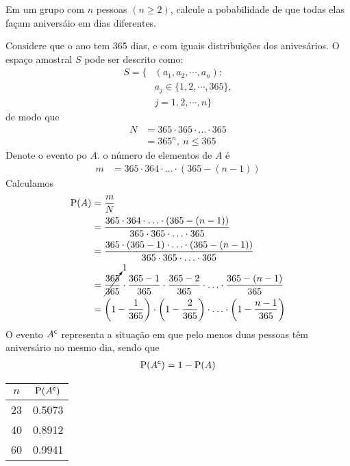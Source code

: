 \begin{example}
    Em um grupo com $n$ pessoas $(n \geq 2)$, calcule a pobabilidade
    de que todas elas façam aniversáio em dias diferentes.
    
    \bigskip
    Considere que o ano tem 365 dias, e com iguais distribuições
    dos anivesários.
    O espaço amostral $S$ pode ser descrito como:
    \begin{align*}
        S = \{&(a_1, a_2, \cdots, a_n) : \\
        & a_j \in \{1, 2, \cdots, 365\}, \\
        & j = 1, 2, \cdots, n
        \}
    \end{align*}
    de modo que
    \begin{align*}
        N &= 365 \cdot 365 \cdot \ldots \cdot 365 \\
        &= 365^n,\ n \leq 365
    \end{align*}
    Denote o evento po $A$. o número de elementos de $A$ é
    \begin{align*}
        m &= 365 \cdot 364 \cdot \ldots \cdot (365 - (n - 1))
    \end{align*}
    Calculamos
    \begin{align*}
        \operatorname{P}(A) &= \frac{m}{N} \\
        &= \frac{365 \cdot 364 \cdot \ldots \cdot (365 - (n - 1))}
            {365 \cdot 365 \cdot \ldots \cdot 365} \\
        &= \frac{365 \cdot (365 - 1) \cdot \ldots \cdot (365 - (n - 1))}
            {365 \cdot 365 \cdot \ldots \cdot 365} \\
        &= \cancelto{1}{\frac{365}{365}} \cdot \frac{365 - 1}{365}  \cdot \frac{365 - 2}{365}
        \cdot \ldots \cdot \frac{365 - (n - 1)}{365} \\
        &= \left(1 - \frac{1}{365}\right)
        \cdot \left(1 - \frac{2}{365}\right)
        \cdot \ldots
        \cdot \left(1 - \frac{n - 1}{365}\right) \\
    \end{align*}
    O evento ${A}^{\mathsf{c}}$ representa a situação em que pelo menos
    duas pessoas têm aniversário no mesmo dia, sendo que
    \begin{align*}
        \operatorname{P}({A}^{\mathsf{c}}) = 1- \operatorname{P}(A)
    \end{align*}
    \begin{center}
        \begin{tabular}{cc}
            \toprule
            $n$ & $\operatorname{P}({A}^{\mathsf{c}})$ \\
            \midrule
            23 & 0.5073 \\
            40 & 0.8912 \\
            60 & 0.9941 \\
            \bottomrule
        \end{tabular}
    \end{center}
\end{example}

